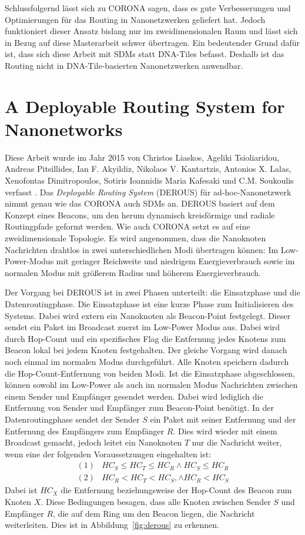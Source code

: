 Schlussfolgernd lässt sich zu CORONA sagen, dass es gute Verbesserungen und Optimierungen für das Routing in Nanonetzwerken geliefert hat. Jedoch funktioniert dieser Ansatz bislang nur im zweidimensionalen Raum und lässt sich in Bezug auf diese Masterarbeit schwer übertragen. Ein bedeutender Grund dafür ist, dass sich diese Arbeit mit SDMs statt DNA-Tiles befasst. Deshalb ist das Routing nicht in DNA-Tile-basierten Nanonetzwerken anwendbar.

\section{A Deployable Routing System for Nanonetworks}

Diese Arbeit wurde im Jahr 2015 von Christos Liaskos, Ageliki Tsioliaridou, Andreas Pitsillides, Ian F. Akyildiz, Nikolaos V. Kantartzis, Antonios X. Lalas, Xenofontas Dimitropoulos, Sotiris Ioannidis Maria Kafesaki und C.M. Soukoulis verfasst \cite{liaskos2015sdm}. Das \emph{Deployable Routing System} (DEROUS) für ad-hoc-Nanonetzwerk nimmt genau wie das CORONA auch SDMs an. DEROUS basiert auf dem Konzept eines Beacons, um den herum dynamisch kreisförmige und radiale Routingpfade geformt werden. Wie auch CORONA setzt es auf eine zweidimensionale Topologie. Es wird angenommen, dass die Nanoknoten Nachrichten drahtlos in zwei unterschiedlichen Modi übertragen können: Im Low-Power-Modus mit geringer Reichweite und niedrigem Energieverbrauch sowie im normalen Modus mit größerem Radius und höherem Energieverbrauch.

Der Vorgang bei DEROUS ist in zwei Phasen unterteilt: die Einsatzphase und die Datenroutingphase. Die Einsatzphase ist eine kurze Phase zum Initialisieren des Systems. Dabei wird extern ein Nanoknoten als Beacon-Point festgelegt. Dieser sendet ein Paket im Broadcast zuerst im Low-Power Modus aus. Dabei wird durch Hop-Count und ein spezifisches Flag die Entfernung jedes Knotens zum Beacon lokal bei jedem Knoten festgehalten. Der gleiche Vorgang wird danach noch einmal im normalen Modus durchgeführt. Alle Knoten speichern dadurch die Hop-Count-Entfernung von beiden Modi. Ist die Einsatzphase abgeschlossen, können sowohl im Low-Power als auch im normalen Modus Nachrichten zwischen einem Sender und Empfänger gesendet werden. Dabei wird lediglich die Entfernung von Sender und Empfänger zum Beacon-Point benötigt. In der Datenroutingphase sendet der Sender $S$ ein Paket mit seiner Entfernung und der Entfernung des Empfängers zum Empfänger $R$. Dies wird wieder mit einem Broadcast gemacht, jedoch leitet ein Nanoknoten $T$ nur die Nachricht weiter, wenn eine der folgenden Voraussetzungen eingehalten ist:
\begin{align*}
    (1)& HC_S \leq HC_T \leq HC_R \land HC_S \leq HC_R\\
    (2)& HC_R < HC_T < HC_S, \land HC_R < HC_S
\end{align*}
Dabei ist $HC_X$ die Entfernung beziehungsweise der Hop-Count des Beacon zum Knoten $X$. Diese Bedingungen besagen, dass alle Knoten zwischen Sender $S$ und Empfänger $R$, die auf dem Ring um den Beacon liegen, die Nachricht weiterleiten. Dies ist in Abbildung~\ref{fig:derous} zu erkennen.

